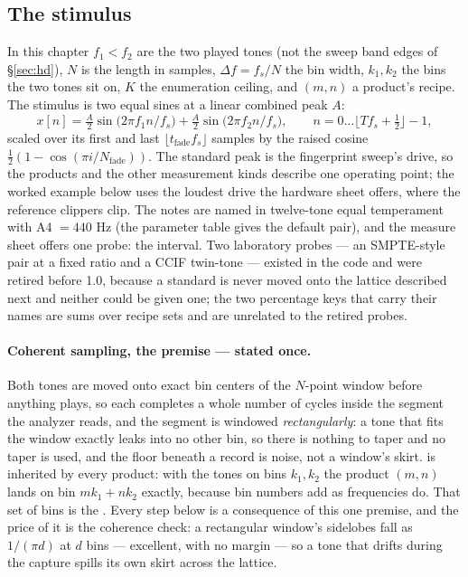 \documentclass[11pt,a4paper]{article}
\begin{document}
\subsection{The stimulus}
\label{sec:imd-stimulus}
In this chapter $f_1 < f_2$ are the two played tones (not the sweep band
edges of \S\ref{sec:hd}), $N$ is the  length in
samples, $\Delta f = f_s/N$ the bin width, $k_1, k_2$ the bins the two
tones sit on, $K$ the enumeration ceiling, and $(m, n)$ a product's recipe.
The stimulus is two equal sines at a linear combined peak $A$:
\begin{equation}
  x[n] = \tfrac{A}{2}\sin\!\big(2\pi f_1 n/f_s\big) + \tfrac{A}{2}\sin\!\big(2\pi f_2 n/f_s\big),
  \qquad n = 0 \ldots \lfloor T f_s + \tfrac12\rfloor - 1,
  \label{eq:twotone}
\end{equation}
scaled over its first and last $\lfloor t_{\mathrm{fade}} f_s\rfloor$
samples by the raised cosine $\tfrac12(1 - \cos(\pi i/N_{\mathrm{fade}}))$.
The standard peak is the fingerprint sweep's drive, so the products and
the other measurement kinds describe one operating point; the worked
example below uses the loudest drive the hardware sheet offers, where the
reference clippers clip. The notes are named in twelve-tone equal
temperament with A4 $= 440$ Hz (the parameter table gives the default
pair), and the measure sheet offers one probe: the interval. Two
laboratory probes --- an SMPTE-style pair at a fixed ratio and a CCIF
twin-tone --- existed in the code and were retired before 1.0, because a
standard is never moved onto the lattice described next and neither could
be given one; the two percentage keys that carry their names are sums
over recipe sets and are unrelated to the retired probes.

\paragraph{Coherent sampling, the premise --- stated once.} Both tones are
moved onto exact bin centers of the $N$-point window before anything
plays, so each completes a whole number of cycles inside the segment the
analyzer reads, and the segment is windowed \emph{rectangularly}: a tone
that fits the window exactly leaks into no other bin, so there is nothing
to taper and no taper is used, and the floor beneath a record is noise,
not a window's skirt.  is inherited by every
product: with the tones on bins $k_1, k_2$ the product $(m, n)$ lands on
bin $m k_1 + n k_2$ exactly, because bin numbers add as frequencies do.
That set of bins is the . Every step below is a
consequence of this one premise, and the price of it is the coherence
check: a rectangular window's sidelobes fall as $1/(\pi d)$ at $d$ bins
--- excellent, with no margin --- so a tone that drifts during the
capture spills its own skirt across the lattice.
\end{document}
